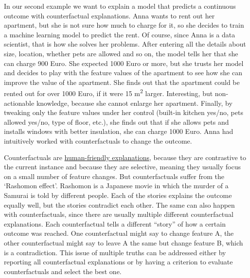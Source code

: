 \documentclass[12pt,]{krantz}
\begin{document}
In our second example we want to explain a model that predicts a
continuous outcome with counterfactual explanations. Anna wants to rent
out her apartment, but she is not sure how much to charge for it, so she
decides to train a machine learning model to predict the rent. Of
course, since Anna is a data scientist, that is how she solves her
problems. After entering all the details about size, location, whether
pets are allowed and so on, the model tells her that she can charge 900
Euro. She expected 1000 Euro or more, but she trusts her model and
decides to play with the feature values of the apartment to see how she
can improve the value of the apartment. She finds out that the apartment
could be rented out for over 1000 Euro, if it were 15
m\textsuperscript{2} larger. Interesting, but non-actionable knowledge,
because she cannot enlarge her apartment. Finally, by tweaking only the
feature values under her control (built-in kitchen yes/no, pets allowed
yes/no, type of floor, etc.), she finds out that if she allows pets and
installs windows with better insulation, she can charge 1000 Euro. Anna
had intuitively worked with counterfactuals to change the outcome.

Counterfactuals are \protect\hyperlink{good-explanation}{human-friendly
explanations}, because they are contrastive to the current instance and
because they are selective, meaning they usually focus on a small number
of feature changes. But counterfactuals suffer from the `Rashomon
effect'. Rashomon is a Japanese movie in which the murder of a Samurai
is told by different people. Each of the stories explains the outcome
equally well, but the stories contradict each other. The same can also
happen with counterfactuals, since there are usually multiple different
counterfactual explanations. Each counterfactual tells a different
``story'' of how a certain outcome was reached. One counterfactual might
say to change feature A, the other counterfactual might say to leave A
the same but change feature B, which is a contradiction. This issue of
multiple truths can be addressed either by reporting all counterfactual
explanations or by having a criterion to evaluate counterfactuals and
select the best one.
\end{document}
